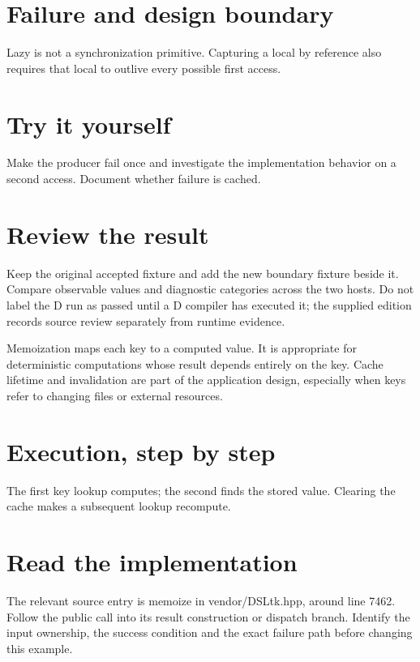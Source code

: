 
\section*{Failure and design boundary}
Lazy is not a synchronization primitive. Capturing a local by reference also requires that local to outlive every possible first access.

\section*{Try it yourself}
Make the producer fail once and investigate the implementation behavior on a second access. Document whether failure is cached.

\section*{Review the result}
Keep the original accepted fixture and add the new boundary fixture beside it. Compare observable values and diagnostic categories across the two hosts. Do not label the D run as passed until a D compiler has executed it; the supplied edition records source review separately from runtime evidence.

\clearpage
{}
Memoization maps each key to a computed value. It is appropriate for deterministic computations whose result depends entirely on the key. Cache lifetime and invalidation are part of the application design, especially when keys refer to changing files or external resources.


\section*{Execution, step by step}
The first key lookup computes; the second finds the stored value. Clearing the cache makes a subsequent lookup recompute.

\section*{Read the implementation}
The relevant source entry is memoize in vendor/DSLtk.hpp, around line 7462. Follow the public call into its result construction or dispatch branch. Identify the input ownership, the success condition and the exact failure path before changing this example.

